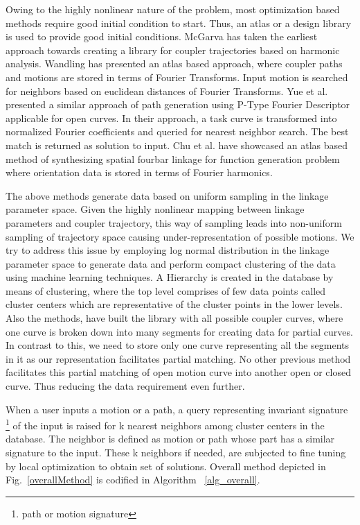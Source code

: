 \documentclass[twocolumn,10pt]{asme2e}
\begin{document}
Owing to the highly nonlinear nature of the problem, most optimization based methods require good initial condition to start.
Thus, an atlas or a design library is used to provide good initial conditions.
McGarva\cite{mcgarva1994} has taken the earliest approach towards creating a library for coupler trajectories based on harmonic analysis.
Wandling\cite{wandling2000} has presented an atlas based approach, where coupler paths and motions are stored in terms of Fourier Transforms.
Input motion is searched for neighbors based on euclidean distances of Fourier Transforms.
Yue et al.\cite{yue-pathgen2011} presented a similar approach of path generation using P-Type Fourier Descriptor applicable for open curves.
In their approach, a task curve is transformed into normalized Fourier coefficients and queried for nearest neighbor search.
The best match is returned as solution to input. Chu et al.\cite{chu2010} have showcased an atlas based method of synthesizing spatial fourbar linkage for function generation problem where orientation data is stored in terms of Fourier harmonics.

The above methods generate data based on uniform sampling in the linkage parameter space.
Given the highly nonlinear mapping between linkage parameters and coupler trajectory, this way of sampling leads into non-uniform sampling of trajectory space causing under-representation of possible motions.
We try to address this issue by employing log normal distribution in the linkage parameter space to generate data and perform compact clustering of the data using machine learning techniques.
A Hierarchy is created in the database by means of clustering, where the top level comprises of few data points called cluster centers which are representative of the cluster points in the lower levels.
Also the methods\cite{wandling2000},\cite{yue-pathgen2011} have built the library with all possible coupler curves, where one curve is broken down into many segments for creating data for partial curves.
In contrast to this, we need to store only one curve representing all the segments in it as our representation facilitates partial matching.
No other previous method facilitates this partial matching of open motion curve into another open or closed curve.
Thus reducing the data requirement even further.

When a user inputs a motion or a path, a query representing invariant signature \footnote{path or motion signature} of the input is raised for k nearest neighbors among cluster centers in the database.
The neighbor is defined as motion or path whose part has a similar signature to the input. These k neighbors if needed, are subjected to fine tuning by local optimization to obtain set of solutions.
Overall method depicted in Fig.~\ref{overallMethod} is codified in Algorithm ~\ref{alg_overall}.
\end{document}
